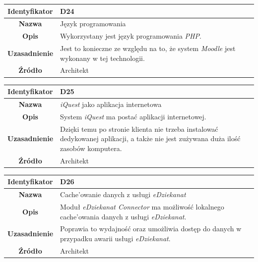 \begin{table}[H]
\centering
\begin{tabular}{ | >{\bfseries}c | p{11cm} | }
\hline
%
Identyfikator & D24 \\ \hline
Nazwa & Język programowania \\ \hline
Opis & Wykorzystany jest język programowania \textit{PHP}. \\ \hline
Uzasadnienie & Jest to konieczne ze względu na to, że system \textit{Moodle} jest wykonany w tej technologii. \\ \hline
Źródło & Architekt \\ \hline
%
\end{tabular}
\end{table}

\begin{table}[H]
\centering
\begin{tabular}{ | >{\bfseries}c | p{11cm} | }
\hline
%
Identyfikator & D25 \\ \hline
Nazwa & \textit{iQuest} jako aplikacja internetowa \\ \hline
Opis & System \textit{iQuest} ma postać aplikacji internetowej. \\ \hline
Uzasadnienie & Dzięki temu po stronie klienta nie trzeba instalować dedykowanej aplikacji, a także nie jest zużywana duża ilość zasobów komputera. \\ \hline
Źródło & Architekt \\ \hline
%
\end{tabular}
\end{table}

\begin{table}[H]
\centering
\begin{tabular}{ | >{\bfseries}c | p{11cm} | }
\hline
%
Identyfikator & D26 \\ \hline
Nazwa & Cache'owanie danych z usługi \textit{eDziekanat} \\ \hline
Opis & Moduł \textit{eDziekanat Connector} ma możliwość lokalnego cache'owania danych z usługi \textit{eDziekanat}. \\ \hline
Uzasadnienie & Poprawia to wydajność oraz umożliwia dostęp do danych w przypadku awarii usługi \textit{eDziekanat}. \\ \hline
Źródło & Architekt \\ \hline
%
\end{tabular}
\end{table}

